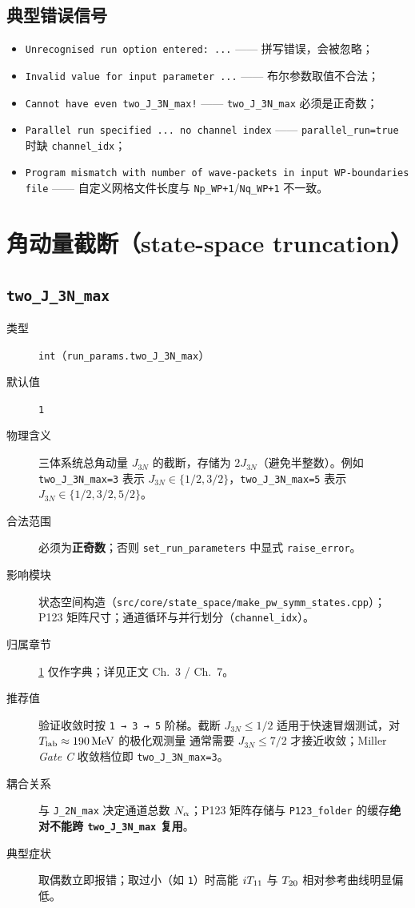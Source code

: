 \subsection{典型错误信号}

\begin{itemize}
  \item \texttt{Unrecognised run option entered: ...} —— 拼写错误，会被忽略；
  \item \texttt{Invalid value for input parameter ...} —— 布尔参数取值不合法；
  \item \texttt{Cannot have even two\_J\_3N\_max!} —— \texttt{two\_J\_3N\_max} 必须是正奇数；
  \item \texttt{Parallel run specified ... no channel index} —— \texttt{parallel\_run=true} 时缺 \texttt{channel\_idx}；
  \item \texttt{Program mismatch with number of wave-packets in input WP-boundaries file} —— 自定义网格文件长度与 \texttt{Np\_WP+1}/\texttt{Nq\_WP+1} 不一致。
\end{itemize}

\section{角动量截断（state-space truncation）}
\label{sec:appE_jtrunc}

\subsection{\texttt{two\_J\_3N\_max}}

\begin{description}
  \item[类型] \texttt{int}（\texttt{run\_params.two\_J\_3N\_max}）
  \item[默认值] \texttt{1}
  \item[物理含义] 三体系统总角动量 \(J_{3N}\) 的截断，存储为 \(2J_{3N}\)（避免半整数）。例如 \texttt{two\_J\_3N\_max=3} 表示
        \(J_{3N}\in\{1/2,3/2\}\)，\texttt{two\_J\_3N\_max=5} 表示 \(J_{3N}\in\{1/2,3/2,5/2\}\)。
  \item[合法范围] 必须为\textbf{正奇数}；否则 \texttt{set\_run\_parameters} 中显式 \texttt{raise\_error}。
  \item[影响模块] 状态空间构造（\texttt{src/core/state\_space/make\_pw\_symm\_states.cpp}）；P123 矩阵尺寸；通道循环与并行划分（\texttt{channel\_idx}）。
  \item[归属章节] \cref{sec:appE_jtrunc} 仅作字典；详见正文 Ch.~3 / Ch.~7。
  \item[推荐值] 验证收敛时按 \texttt{1 → 3 → 5} 阶梯。截断 \(J_{3N}\le 1/2\) 适用于快速冒烟测试，对 \({T_{\text{lab}}}\approx 190\,\mathrm{MeV}\) 的极化观测量
        通常需要 \(J_{3N}\le 7/2\) 才接近收敛；Miller \emph{Gate C} 收敛档位即 \texttt{two\_J\_3N\_max=3}。
  \item[耦合关系] 与 \texttt{J\_2N\_max} 决定通道总数 \(N_\alpha\)；P123 矩阵存储与 \texttt{P123\_folder} 的缓存\textbf{绝对不能跨 \texttt{two\_J\_3N\_max} 复用}。
  \item[典型症状] 取偶数立即报错；取过小（如 \texttt{1}）时高能 \({i T_{11}}\) 与 \({T_{20}}\) 相对参考曲线明显偏低。
\end{description}

